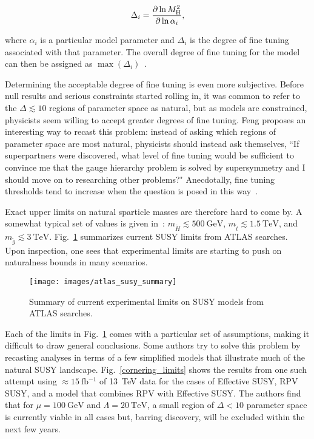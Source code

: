 \documentclass[12pt]{article}
\begin{document}
    \noindent \begin{equation}
        \Delta_i = \frac{\partial \ln{M_{\mathrm{H}}^2}}{\partial \ln{\alpha_i}} ,
        \label{fine_tuning}
    \end{equation}

    \noindent where $\alpha_i$ is a particular model parameter and $\Delta_i$ is the degree of fine tuning associated with that parameter. The overall degree of fine tuning for the model can then be assigned as $\max{\left(\Delta_i\right)}$~\cite{cornering}.

    Determining the acceptable degree of fine tuning is even more subjective. Before null results and serious constraints started rolling in, it was common to refer to the $\Delta \lesssim 10$ regions of parameter space as natural, but as models are constrained, physicists seem willing to accept greater degrees of fine tuning. Feng proposes an interesting way to recast this problem: instead of asking which regions of parameter space are most natural, physicists should instead ask themselves, ``If superpartners were discovered, what level of fine tuning would be sufficient to convince me that the gauge hierarchy problem is solved by supersymmetry and I should move on to researching other problems?" Anecdotally, fine tuning thresholds tend to increase when the question is posed in this way~\cite{feng}.

    Exact upper limits on natural sparticle masses are therefore hard to come by. A somewhat typical set of values is given in~\cite{drees_kim}: $m_{\tilde{H}} \lesssim \SI{500}{\giga\electronvolt}$, $m_{\tilde{t}} \lesssim \SI{1.5}{\tera\electronvolt}$, and $m_{\tilde{g}} \lesssim \SI{3}{\tera\electronvolt}$. Fig.~\ref{atlas_susy_summary} summarizes current SUSY limits from ATLAS searches. Upon inspection, one sees that experimental limits are starting to push on naturalness bounds in many scenarios.

    \noindent \begin{figure}[htbp] \begin{center}
    \texttt{[image: images/atlas\_susy\_summary]}
    \caption{Summary of current experimental limits on SUSY models from ATLAS searches.}
    \label{atlas_susy_summary}
    \end{center} \end{figure}

    Each of the limits in Fig.~\ref{atlas_susy_summary} comes with a particular set of assumptions, making it difficult to draw general conclusions. Some authors try to solve this problem by recasting analyses in terms of a few simplified models that illustrate much of the natural SUSY landscape. Fig.~\ref{cornering_limits} shows the results from one such attempt using $\approx \SI{15}{\femto\barn^{-1}}$ of \SI{13}{\tera\electronvolt} data for the cases of Effective SUSY, RPV SUSY, and a model that combines RPV with Effective SUSY. The authors find that for $\mu = \SI{100}{\giga\electronvolt}$ and $\Lambda = \SI{20}{\tera\electronvolt}$, a small region of $\Delta < 10$ parameter space is currently viable in all cases but, barring discovery, will be excluded within the next few years.
    
\end{document}
